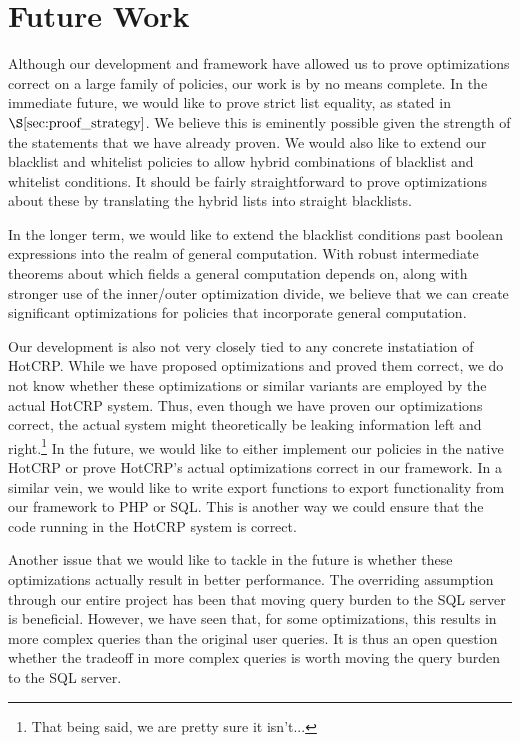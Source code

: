 \documentclass[11pt,journal]{IEEEtran}
\begin{document}
\section{Future Work}
\label{sec:future}
Although our development and framework have allowed us to prove optimizations correct on a large family of policies, our work is by no means complete.  In the immediate future, we would like to prove strict list equality, as stated in $\S\ref{sec:proof_strategy}$.  We believe this is eminently possible given the strength of the statements that we have already proven.  We would also like to extend our blacklist and whitelist policies to allow hybrid combinations of blacklist and whitelist conditions.  It should be fairly straightforward to prove optimizations about these by translating the hybrid lists into straight blacklists.

In the longer term, we would like to extend the blacklist conditions past boolean expressions into the realm of general computation.  With robust intermediate theorems about which fields a general computation depends on, along with stronger use of the inner/outer optimization divide, we believe that we can create significant optimizations for policies that incorporate general computation.

Our development is also not very closely tied to any concrete instatiation of HotCRP.  While we have proposed optimizations and proved them correct, we do not know whether these optimizations or similar variants are employed by the actual HotCRP system.  Thus, even though we have proven our optimizations correct, the actual system might theoretically be leaking information left and right.\footnote{That being said, we are pretty sure it isn't...}  In the future, we would like to either implement our policies in the native HotCRP or prove HotCRP's actual optimizations correct in our framework.  In a similar vein, we would like to write export functions to export functionality from our framework to PHP or SQL.  This is another way we could ensure that the code running in the HotCRP system is correct.

Another issue that we would like to tackle in the future is whether these optimizations actually result in better performance.  The overriding assumption through our entire project has been that moving query burden to the SQL server is beneficial.  However, we have seen that, for some optimizations, this results in more complex queries than the original user queries.  It is thus an open question whether the tradeoff in more complex queries is worth moving the query burden to the SQL server.
\end{document}
